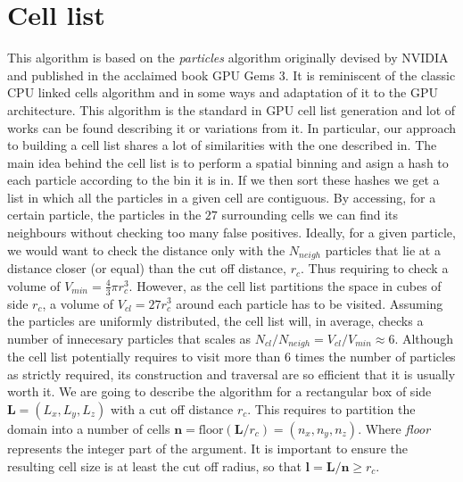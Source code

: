 \documentclass[ twoside,openright,titlepage,numbers=noenddot,%
headinclude,footinclude,cleardoublepage=empty,abstract=on,
BCOR=5mm,paper=a4,fontsize=11pt, dvipsnames
]{scrreprt}
\renewcommand{\vec}[1]{\bm{#1}}
\newcommand{\gpu}{\gls{GPU}\xspace}
\begin{document}
\section{Cell list}\label{sec:celllist}

This algorithm is based on the \emph{particles} algorithm originally devised by NVIDIA and published in the acclaimed book GPU Gems 3\cite{Nguyen2008}. It is reminiscent of the classic CPU linked cells algorithm\cite{Allen2017} and in some ways and adaptation of it to the \gpu architecture. This algorithm is the standard in \gls{GPU} cell list generation and lot of works can be found describing it or variations from it\cite{Anderson2008}\cite{Dominguez2011}\cite{Howard2016}\cite{Brown2011}. In particular, our approach to building a cell list shares a lot of similarities with the one described in\cite{Tang2014}.
The main idea behind the cell list is to perform a spatial binning and asign a hash to each particle according to the bin it is in. If we then sort these hashes we get a list in which all the particles in a given cell are contiguous. By accessing, for a certain particle, the particles in the $27$ surrounding cells we can find its neighbours without checking too many false positives. Ideally, for a given particle, we would want to check the distance only with the $N_{neigh}$ particles that lie at a distance closer (or equal) than the cut off distance, $r_{c}$. Thus requiring to check a volume of $V_{min}=\frac{4}{3}\pi r_{c}^3$. However, as the cell list partitions the space in cubes of side $r_{c}$, a volume of $V_{cl} = 27r_{c}^3$ around each particle has to be visited.
Assuming the particles are uniformly distributed, the cell list will, in average, checks a number of innecesary particles that scales as $N_{cl}/N_{neigh} = V_{cl}/V_{min} \approx 6$. Although the cell list potentially requires to visit more than $6$ times the number of particles as strictly required, its construction and traversal are so efficient that it is usually worth it.
We are going to describe the algorithm for a rectangular box of side $\vec{L}=(L_x, L_y, L_z)$ with a cut off distance $r_{c}$. This requires to partition the domain into a number of cells $\vec{n}=\textrm{floor}(\vec{L}/r_{c}) = (n_x, n_y, n_z)$. Where \emph{floor} represents the integer part of the argument. It is important to ensure the resulting cell size is at least the cut off radius, so that $\vec{l} = \vec{L}/\vec{n} \ge r_{c}$.
\end{document}
